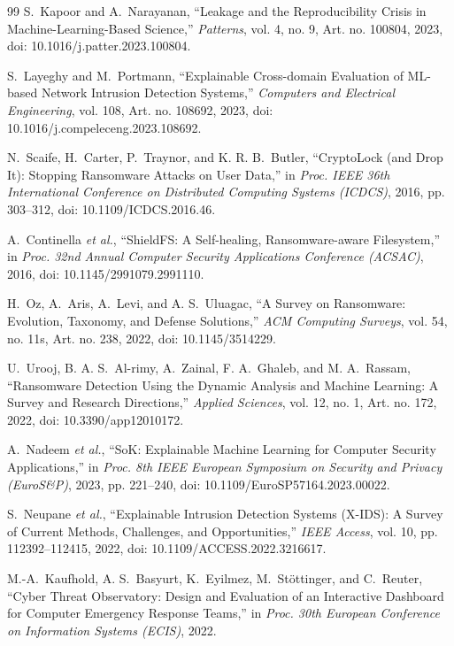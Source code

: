 \documentclass[conference]{IEEEtran}
\begin{document}
\begin{thebibliography}{99}
 S.~Kapoor and A.~Narayanan, ``Leakage and the Reproducibility Crisis in Machine-Learning-Based Science,'' \emph{Patterns}, vol. 4, no. 9, Art. no. 100804, 2023, doi: 10.1016/j.patter.2023.100804.

 S.~Layeghy and M.~Portmann, ``Explainable Cross-domain Evaluation of {ML}-based Network Intrusion Detection Systems,'' \emph{Computers and Electrical Engineering}, vol. 108, Art. no. 108692, 2023, doi: 10.1016/j.compeleceng.2023.108692.

 N.~Scaife, H.~Carter, P.~Traynor, and K. R. B.~Butler, ``{CryptoLock} (and Drop It): Stopping Ransomware Attacks on User Data,'' in \emph{Proc. IEEE 36th International Conference on Distributed Computing Systems (ICDCS)}, 2016, pp. 303--312, doi: 10.1109/ICDCS.2016.46.

 A.~Continella \emph{et al.}, ``{ShieldFS}: A Self-healing, Ransomware-aware Filesystem,'' in \emph{Proc. 32nd Annual Computer Security Applications Conference (ACSAC)}, 2016, doi: 10.1145/2991079.2991110.

 H.~Oz, A.~Aris, A.~Levi, and A. S.~Uluagac, ``A Survey on Ransomware: Evolution, Taxonomy, and Defense Solutions,'' \emph{ACM Computing Surveys}, vol. 54, no. 11s, Art. no. 238, 2022, doi: 10.1145/3514229.

 U.~Urooj, B. A. S.~Al-rimy, A.~Zainal, F. A.~Ghaleb, and M. A.~Rassam, ``Ransomware Detection Using the Dynamic Analysis and Machine Learning: A Survey and Research Directions,'' \emph{Applied Sciences}, vol. 12, no. 1, Art. no. 172, 2022, doi: 10.3390/app12010172.

 A.~Nadeem \emph{et al.}, ``{SoK}: Explainable Machine Learning for Computer Security Applications,'' in \emph{Proc. 8th IEEE European Symposium on Security and Privacy (EuroS\&P)}, 2023, pp. 221--240, doi: 10.1109/EuroSP57164.2023.00022.

 S.~Neupane \emph{et al.}, ``Explainable Intrusion Detection Systems ({X-IDS}): A Survey of Current Methods, Challenges, and Opportunities,'' \emph{IEEE Access}, vol. 10, pp. 112392--112415, 2022, doi: 10.1109/ACCESS.2022.3216617.

 M.-A.~Kaufhold, A. S.~Basyurt, K.~Eyilmez, M.~St\"{o}ttinger, and C.~Reuter, ``Cyber Threat Observatory: Design and Evaluation of an Interactive Dashboard for Computer Emergency Response Teams,'' in \emph{Proc. 30th European Conference on Information Systems (ECIS)}, 2022.


\end{thebibliography}
\end{document}
